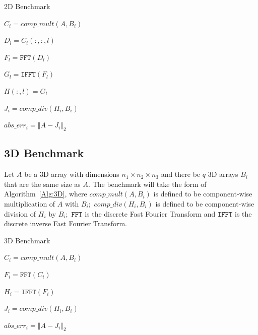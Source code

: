 \documentclass[a4]{article}
\newcommand{\norm}[1]{\left\Vert#1\right\Vert}
\begin{document}
\begin{algorithm}\caption{2D Benchmark}\label{Alg:2D}
\noindent \hrulefill

\begin{algorithmic}



\STATE $C_i = comp\_mult(A,B_i)$



\STATE $D_l = C_i(:,:,l)$

\STATE $F_l = \texttt{FFT}(D_l)$


\STATE $G_l = \texttt{IFFT}(F_l)$

\STATE $H(:,l) = G_l$

\ENDIF


\ENDFOR


\STATE $J_i = comp\_div(H_i,B_i) $

\STATE $abs\_err_i = \norm{A-J_i}_2$

\ENDIF

\ENDFOR

\end{algorithmic}
\noindent \hrulefill

\end{algorithm}

\subsection{3D Benchmark}
Let $A$ be a 3D array with dimensions $n_1\times n_2\times n_3$ and there be $q$ 
3D arrays $B_i$ that are the same size as $A.$  The benchmark will take the form of 
Algorithm~\ref{Alg:3D}, where $comp\_mult(A,B_i)$ is defined to be 
component-wise multiplication of $A$ with $B_i;$  $comp\_div(H_i,B_i)$ 
is defined to be component-wise division of $H_i$ by $B_i;$ $\texttt{FFT}$ 
is the discrete Fast Fourier Transform and $\texttt{IFFT}$ is the 
discrete inverse Fast Fourier Transform. 


\begin{algorithm}\caption{3D Benchmark}\label{Alg:3D}
\noindent \hrulefill

\begin{algorithmic}



\STATE $C_i = comp\_mult(A,B_i)$



\STATE $F_i = \texttt{FFT}(C_i)$


\STATE $H_i = \texttt{IFFT}(F_i)$

\STATE $J_i = comp\_div(H_i,B_i) $

\STATE $abs\_err_i = \norm{A-J_i}_2$

\ENDIF

\ENDFOR

\end{algorithmic}
\noindent \hrulefill

\end{algorithm}
\end{document}
